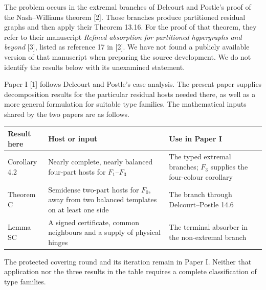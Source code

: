 \documentclass[english,11pt,a4paper]{article}
\begin{document}
The problem occurs in the extremal branches of Delcourt and Postle's proof of the Nash--Williams theorem {[}2{]}. Those branches produce partitioned residual graphs and then apply their Theorem 13.16. For the proof of that theorem, they refer to their manuscript \emph{Refined absorption for partitioned hypergraphs and beyond} {[}3{]}, listed as reference 17 in {[}2{]}. We have not found a publicly available version of that manuscript when preparing the source development. We do not identify the results below with its unexamined statement.

Paper I {[}1{]} follows Delcourt and Postle's case analysis. The present paper supplies decomposition results for the particular residual hosts needed there, as well as a more general formulation for suitable type families. The mathematical inputs shared by the two papers are as follows.

{\begin{longtable}[]{@{}
  >{\raggedright\arraybackslash}p{}
  >{\raggedright\arraybackslash}p{}
  >{\raggedright\arraybackslash}p{}@{}}
\toprule\noalign{}
\begin{minipage}[b]{\linewidth}\raggedright
Result here
\end{minipage} & \begin{minipage}[b]{\linewidth}\raggedright
Host or input
\end{minipage} & \begin{minipage}[b]{\linewidth}\raggedright
Use in Paper I
\end{minipage} \\
\midrule\noalign{}
\endhead
\bottomrule\noalign{}
\endlastfoot
Corollary 4.2 & Nearly complete, nearly balanced four-part hosts for \(F_1\)--\(F_3\) & The typed extremal branches; \(F_3\) supplies the four-colour corollary \\
Theorem C & Semidense two-part hosts for \(F_0\), away from two balanced templates on at least one side & The branch through Delcourt--Postle 14.6 \\
Lemma SC & A signed certificate, common neighbours and a supply of physical hinges & The terminal absorber in the non-extremal branch \\
\end{longtable}
}

The protected covering round and its iteration remain in Paper I. Neither that application nor the three results in the table requires a complete classification of type families.
\end{document}
